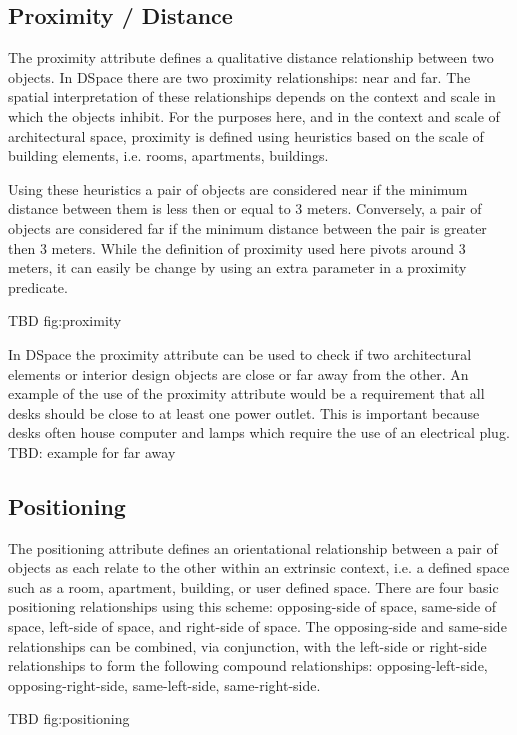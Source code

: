 \documentclass[12pt]{ucthesis}
\begin{document}
\subsection{Proximity / Distance}
The proximity attribute defines a qualitative distance relationship between two objects. In DSpace there are two proximity relationships: near and far. The spatial interpretation of these relationships depends on the context and scale in which the objects inhibit. For the purposes here, and in the context and scale of architectural space, proximity is defined using heuristics based on the scale of building elements, i.e. rooms, apartments, buildings.

Using these heuristics a pair of objects are considered near if the minimum distance between them is less then or equal to 3 meters. Conversely, a pair of objects are considered far if the minimum distance between the pair is greater then 3 meters. While the definition of proximity used here pivots around 3 meters, it can easily be change by using an extra parameter in a proximity predicate. 

TBD fig:proximity
   
In DSpace the proximity attribute can be used to check if two architectural elements or interior design objects are close or far away from the other. An example of the use of the proximity attribute would be a requirement that all desks should be close to at least one power outlet. This is important because desks often house computer and lamps which require the use of an electrical plug. TBD: example for far away



\subsection{Positioning}
The positioning attribute defines an orientational relationship between a pair of objects as each relate to the other within an extrinsic context, i.e. a defined space such as a room, apartment, building, or user defined space. There are four basic positioning relationships using this scheme: opposing-side of space, same-side of space, left-side of space, and right-side of space. The opposing-side and same-side relationships can be combined, via conjunction, with the left-side or right-side relationships to form the following compound relationships: opposing-left-side, opposing-right-side, same-left-side, same-right-side.

TBD fig:positioning 
\end{document}
